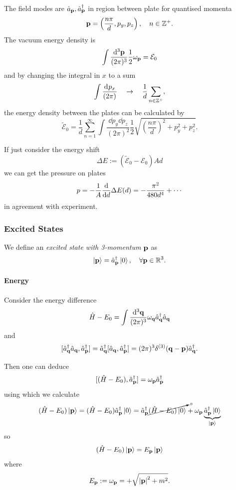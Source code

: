 \documentclass[a4paper,11pt]{article}
\begin{document}
	The field modes are $\hat a _{\vb p}, \hat a^\dagger _{\vb p}$ in region between plate for quantised momenta \[
		\vb p = \left( \frac{n \pi}{d}, p_y, p_z \right), \quad n \in \mathbb{Z}^{+}.
	\]
	The vacuum energy density is
	\[
		\int \frac{\dd[3]{\vb p}}{(2\pi)^{3}} \frac{1}{2} \omega _{\vb p} = \mathcal{E}_0
	\]
	and by changing the integral in $x$ to a sum
	\[
		\int \frac{\dd[]{p_x}}{(2\pi)^{}} \quad \to \quad \frac{1}{d}\sum _{n \in \mathbb{Z}^+},
	\]
	the energy density between the plates can be calculated by
	\[
		\tilde{\mathcal{E}}_0 = \frac{1}{d} \sum _{n = 1}^{\infty} \int \frac{\dd{p_y} \dd{p_z}}{(2 \pi)^2} \frac{1}{2} \sqrt{\left( \frac{n \pi}{d} \right)^2 + p_y^2 + p_z^2}.
	\]
	
	If just consider the energy shift
	\[
		\Delta E := (\tilde{\mathcal{E}}_0 - \mathcal{E}_0) A d
	\]
	we can get the pressure on plates
	\[
		p = - \frac{1}{A}\dv{d} \Delta E(d) = - \frac{\pi^2}{480 d^4} + \cdots
	\]
	in agreement with experiment.

	\subsubsection{Excited States}

	\begin{defi}
		We define an \emph{excited state with 3-momentum $\vb p$} as
		\[
			\ket{\vb p} = \hat a^\dagger _{\vb p} \ket{0}, \quad \forall \vb p \in \mathbb{R}^3.
		\]
	\end{defi}

	\paragraph{Energy}
	Consider the energy difference
	\[
		\hat H - E_0 = \int \frac{\dd[3]{\vb q}}{(2\pi)^{3}} \omega _{\vb q} \hat a^\dagger _{\vb q} \hat a _{\vb q}
	\]
	and
	\[
		[\hat a^\dagger _{\vb q} \hat a _{\vb q}, \hat a^\dagger _{\vb p}] = \hat a^\dagger _{\vb q}[\hat a _{\vb q}, \hat a^\dagger _{\vb p}] = (2 \pi)^3 \delta ^{(3)}(\vb q - \vb p) \hat a^\dagger _{\vb q}.
	\]

	Then one can deduce
	\[
		[(\hat H - E_0), \hat a^\dagger _{\vb p}] = \omega _{\vb p} \hat a^\dagger _{\vb p}
	\]
	using which we calculate
	\begin{align*}
		(\hat H - E_0)\ket{\vb p} = (\hat H - E_0) \hat a^\dagger _{\vb p} \ket{0} = \hat a^\dagger _{\vb p} \cancelto{\text{\tiny 0}}{(\hat H - E_0)\ket{0}} + \omega _{\vb p} \underbrace{\hat a^\dagger _{\vb p} \ket{0}}_{\ket{\vb p}}
	\end{align*}
	so
	\[
		(\hat H - E_0)\ket{\vb p} = E _{\vb p}\ket{\vb p}
	\]
	where
	\[
		E _{\vb p} := \omega _{\vb p} = + \sqrt{\abs{\vb p}^2 + m^2}.
	\]
	
\end{document}
